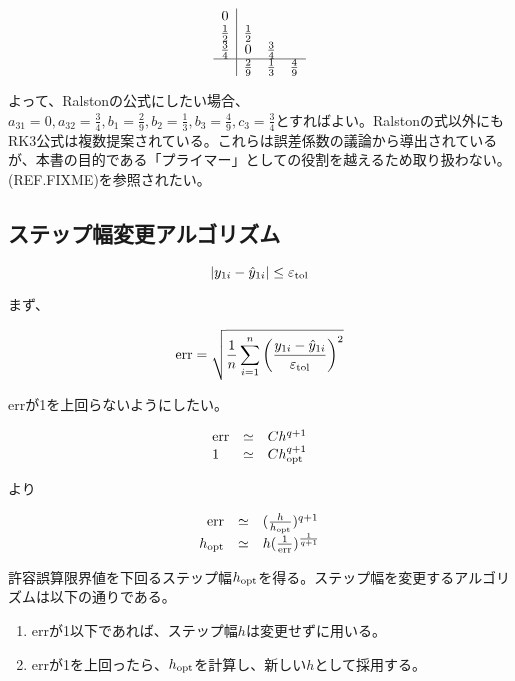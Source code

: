 \[
\begin{array}{c|ccc}
0           &             &             & \\
\frac{1}{2} & \frac{1}{2} &             & \\
\frac{3}{4} & 0           & \frac{3}{4} & \\
\hline
            & \frac{2}{9} & \frac{1}{3} & \frac{4}{9}\\
\end{array}
\] 

よって、Ralstonの公式にしたい場合、\(a_{31} = 0, a_{32} = \frac{3}{4}, b_1 = \frac{2}{9}, b_2 = \frac{1}{3}, b_3 = \frac{4}{9}, c_3 = \frac{3}{4}\)とすればよい。Ralstonの式以外にもRK3公式は複数提案されている。これらは誤差係数の議論から導出されているが、本書の目的である「プライマー」としての役割を越えるため取り扱わない。(REF.FIXME)を参照されたい。

\subsection{ステップ幅変更アルゴリズム}

\[|y_{1i} - \hat{y}_{1i}| \leq \varepsilon_{\rm tol}\]

まず、

\[{\rm err} = \sqrt{\frac{1}{n}\sum^n_{i=1}\left(\frac{y_{1i} - \hat{y}_{1i}}{\varepsilon_{\rm tol}}\right)^2}\]

errが1を上回らないようにしたい。

\[
\begin{array}{lcl}
{\rm err} & \simeq & C h^{q+1} \\
1 & \simeq & C h_{\rm opt}^{q+1} \\
\end{array}
\]

より

\[
\begin{array}{rcl}
{\rm err} & \simeq & ( \frac{h}{h_{\rm opt}} )^{q+1} \\
h_{\rm opt} & \simeq & h (\frac{1}{\rm err})^{\frac{1}{q+1}}\\ 
\end{array}
\]

許容誤算限界値を下回るステップ幅\(h_{\rm opt}\)を得る。ステップ幅を変更するアルゴリズムは以下の通りである。

\begin{enumerate}
\item errが1以下であれば、ステップ幅\(h\)は変更せずに用いる。
\item errが1を上回ったら、\(h_{\rm opt}\)を計算し、新しい\(h\)として採用する。
\end{enumerate}

